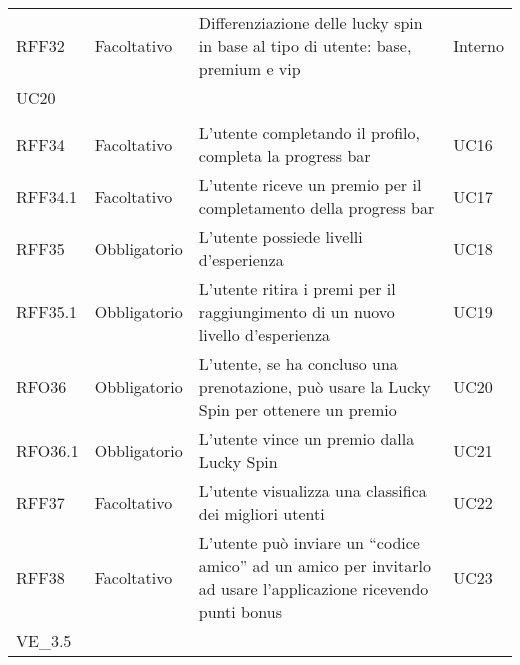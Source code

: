 \begin{longtable}{ >{\centering}p{} >{\centering}p{}
		>{\raggedright}p{} >{\centering}p{}}
	RFF32	&	Facoltativo	& Differenziazione delle lucky spin in base al tipo di utente: base, premium e vip &	Interno\\UC20  \\ 	\tabularnewline
	RFF34 &	Facoltativo &	L’utente completando il profilo, completa la progress bar &	UC16 \tabularnewline
	RFF34.1	& Facoltativo &	L’utente riceve un premio per il completamento della progress bar &	UC17 \tabularnewline
	RFF35 &	Obbligatorio &	L’utente possiede livelli d’esperienza & UC18 \tabularnewline
	RFF35.1	& Obbligatorio & L’utente ritira i premi per il raggiungimento di un nuovo livello d’esperienza & UC19 \tabularnewline
	RFO36 & Obbligatorio & L’utente, se ha concluso una prenotazione, può usare la Lucky Spin per ottenere un premio & UC20 \tabularnewline
	RFO36.1	& Obbligatorio & L’utente vince un premio dalla Lucky Spin & UC21 \tabularnewline
	RFF37 & Facoltativo & L’utente visualizza una classifica dei migliori utenti & UC22 \tabularnewline
	RFF38 & Facoltativo & L’utente può inviare un “codice amico” ad un amico per invitarlo ad usare l’applicazione ricevendo punti bonus & UC23 \\ VE\_3.5
	
\end{longtable}


